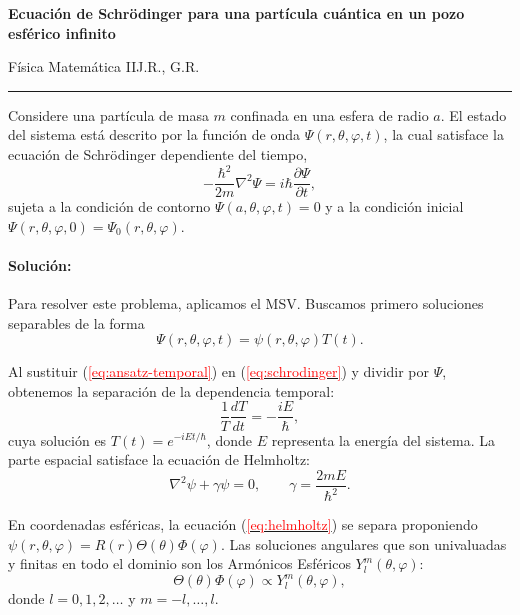 \documentclass[11pt]{article}
\renewcommand{\eqref}[1]{(\hyperref[#1]{\textcolor{red}{\ref*{#1}}})}
\newcommand{\encabezado}[3]{%
{\Large\bfseries #1\par}
\vspace{2pt}
{\normalsize #2\hfill #3\par}
\vspace{6pt}\hrule\vspace{8pt}}
\begin{document}
\encabezado{Ecuación de Schrödinger para una partícula cuántica en un pozo esférico infinito}{Física Matemática II}{J.R., G.R.}

Considere una partícula de masa $m$ confinada en una esfera de radio $a$. El estado del sistema está descrito por la función de onda $\Psi(r,\theta,\varphi,t)$, la cual satisface la ecuación de Schrödinger dependiente del tiempo,
\begin{equation}\label{eq:schrodinger}
-\frac{\hbar^2}{2m}\nabla^2\Psi = i\hbar\frac{\partial\Psi}{\partial t},
\end{equation}
sujeta a la condición de contorno $\Psi(a, \theta, \varphi, t) = 0$ y a la condición inicial $\Psi(r,\theta,\varphi,0) = \Psi_0(r,\theta,\varphi)$.

\paragraph{Solución: }
Para resolver este problema, aplicamos el MSV. Buscamos primero soluciones separables de la forma
\begin{equation}\label{eq:ansatz-temporal}
\Psi(r,\theta,\varphi,t) = \psi(r,\theta,\varphi) T(t).
\end{equation}

Al sustituir \eqref{eq:ansatz-temporal} en \eqref{eq:schrodinger} y dividir por $\Psi$, obtenemos la separación de la dependencia temporal:
\[
\frac{1}{T} \frac{dT}{dt} = -\frac{iE}{\hbar},
\]
cuya solución es $T(t) = e^{-iEt/\hbar}$, donde $E$ representa la energía del sistema. La parte espacial satisface la ecuación de Helmholtz:
\begin{equation}\label{eq:helmholtz}
\nabla^2\psi + \gamma\psi = 0, \qquad  \gamma = \frac{2mE}{\hbar^2}.
\end{equation}

En coordenadas esféricas, la ecuación \eqref{eq:helmholtz} se separa proponiendo $\psi(r,\theta,\varphi) = R(r)\Theta(\theta)\Phi(\varphi)$. Las soluciones angulares que son univaluadas y finitas en todo el dominio son los Armónicos Esféricos $Y_l^m(\theta, \varphi)$:
\[
\Theta(\theta)\Phi(\varphi) \propto Y_l^m(\theta, \varphi),
\]
donde $l = 0, 1, 2, \dots$ y $m = -l, \dots, l$.
\end{document}

